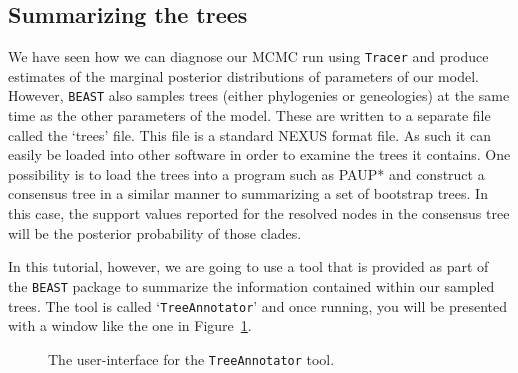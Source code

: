 \documentclass[cup7b, english]{cupbook}
\begin{document}
\subsection{Summarizing the trees}

We have seen how we can diagnose our MCMC run using \texttt{Tracer} and produce estimates of the
marginal posterior distributions of parameters of our model. However, \texttt{BEAST} also samples
trees (either phylogenies or geneologies) at the same time as the other parameters
of the model. These are written to a separate file called the `trees' file. This
file is a standard NEXUS format file. As such it can easily be loaded into other
software in order to examine the trees it contains. One possibility is to load the
trees into a program such as PAUP* and construct a consensus tree in a similar manner
to summarizing a set of bootstrap trees. In this case, the support values reported
for the resolved nodes in the consensus tree will be the posterior probability of
those clades.

In this tutorial, however, we are going to use a tool that is provided as part
of the \texttt{BEAST} package to summarize the information contained within our sampled
trees. The tool is called `\texttt{TreeAnnotator}' and once running, you will be presented with a
window like the one in Figure~\ref{fig:figure10}.

\begin{figure}[htbp]
\begin{center}
\leavevmode
{}
\end{center}
\caption{The user-interface for the \texttt{TreeAnnotator} tool.}
\label{fig:figure10}
\end{figure}
\end{document}
